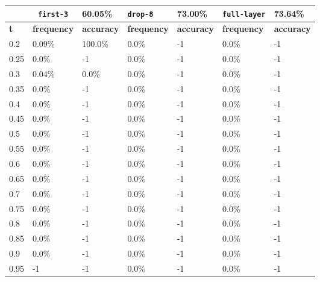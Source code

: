 
\begin{table}[t]
\centering
\begin{tabular}{lllllll} %
\hline

\multicolumn{1}{c}{}& 
\multicolumn{1}{c}{\texttt{first-3}} & \multicolumn{1}{l|}{60.05\%} 
& \multicolumn{1}{l}{\texttt{drop-8}} & \multicolumn{1}{l|}{73.00\%}
& \multicolumn{1}{l}{\texttt{full-layer}} & 73.64\%
\\ \hline
\multicolumn{1}{l|}{\textbf{t}} &
\multicolumn{1}{l|}{\textbf{frequency}} & 
\multicolumn{1}{l|}{\textbf{accuracy}} & 
\multicolumn{1}{l|}{\textbf{frequency}} & 
\multicolumn{1}{l|}{\textbf{accuracy}} & 
\multicolumn{1}{l|}{\textbf{frequency}} & 
\multicolumn{1}{l|}{\textbf{accuracy}} \\ \hline
	\multicolumn{1}{l|}{0.2}&  0.09\% & \multicolumn{1}{l|}{100.0\%}& 0.0\% & \multicolumn{1}{l|}{-1}& 0.0\% & -1\\ 
\multicolumn{1}{l|}{0.25}&  0.0\% & \multicolumn{1}{l|}{-1}& 0.0\% & \multicolumn{1}{l|}{-1}& 0.0\% & -1\\ 
\multicolumn{1}{l|}{0.3}&  0.04\% & \multicolumn{1}{l|}{0.0\%}& 0.0\% & \multicolumn{1}{l|}{-1}& 0.0\% & -1\\ 
\multicolumn{1}{l|}{0.35}&  0.0\% & \multicolumn{1}{l|}{-1}& 0.0\% & \multicolumn{1}{l|}{-1}& 0.0\% & -1\\ 
\multicolumn{1}{l|}{0.4}&  0.0\% & \multicolumn{1}{l|}{-1}& 0.0\% & \multicolumn{1}{l|}{-1}& 0.0\% & -1\\ 
\multicolumn{1}{l|}{0.45}&  0.0\% & \multicolumn{1}{l|}{-1}& 0.0\% & \multicolumn{1}{l|}{-1}& 0.0\% & -1\\ 
\multicolumn{1}{l|}{0.5}&  0.0\% & \multicolumn{1}{l|}{-1}& 0.0\% & \multicolumn{1}{l|}{-1}& 0.0\% & -1\\ 
\multicolumn{1}{l|}{0.55}&  0.0\% & \multicolumn{1}{l|}{-1}& 0.0\% & \multicolumn{1}{l|}{-1}& 0.0\% & -1\\ 
\multicolumn{1}{l|}{0.6}&  0.0\% & \multicolumn{1}{l|}{-1}& 0.0\% & \multicolumn{1}{l|}{-1}& 0.0\% & -1\\ 
\multicolumn{1}{l|}{0.65}&  0.0\% & \multicolumn{1}{l|}{-1}& 0.0\% & \multicolumn{1}{l|}{-1}& 0.0\% & -1\\ 
\multicolumn{1}{l|}{0.7}&  0.0\% & \multicolumn{1}{l|}{-1}& 0.0\% & \multicolumn{1}{l|}{-1}& 0.0\% & -1\\ 
\multicolumn{1}{l|}{0.75}&  0.0\% & \multicolumn{1}{l|}{-1}& 0.0\% & \multicolumn{1}{l|}{-1}& 0.0\% & -1\\ 
\multicolumn{1}{l|}{0.8}&  0.0\% & \multicolumn{1}{l|}{-1}& 0.0\% & \multicolumn{1}{l|}{-1}& 0.0\% & -1\\ 
\multicolumn{1}{l|}{0.85}&  0.0\% & \multicolumn{1}{l|}{-1}& 0.0\% & \multicolumn{1}{l|}{-1}& 0.0\% & -1\\ 
\multicolumn{1}{l|}{0.9}&  0.0\% & \multicolumn{1}{l|}{-1}& 0.0\% & \multicolumn{1}{l|}{-1}& 0.0\% & -1\\ 
\multicolumn{1}{l|}{0.95}&  -1 & \multicolumn{1}{l|}{-1}& 0.0\% & \multicolumn{1}{l|}{-1}& 0.0\% & -1\\ 


\end{tabular}
\end{table}

